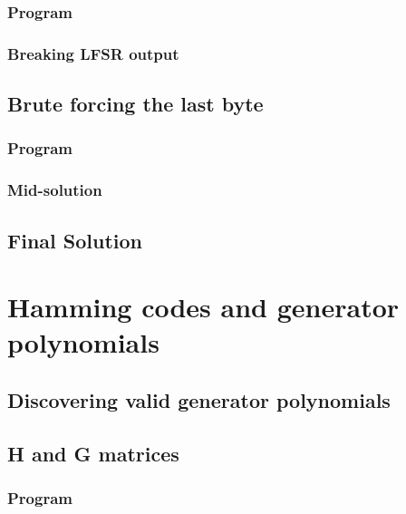 \documentclass[pdftex, 12pt, a4paper]{article}
\begin{document}
\subsubsection{Program}\label{break-lfsr}

\pagebreak

\subsubsection{Breaking LFSR output}\label{break-lfsr-out}
\pagebreak

\subsection{Brute forcing the last byte}
\subsubsection{Program}\label{last-byte}

\pagebreak

\subsubsection{Mid-solution}\label{last-byte-out}

\subsection{Final Solution}\label{q1-solution}
\pagebreak

\section{Hamming codes and generator polynomials}
\subsection{Discovering valid generator polynomials}\label{hammgen}

\pagebreak

\subsection{H and G matrices}
\subsubsection{Program}\label{hammgen-hg}

\end{document}
